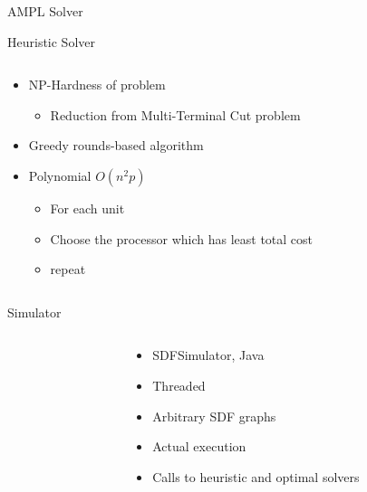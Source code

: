 \documentclass{beamer}
\begin{document}
\begin{frame}{AMPL Solver}

\end{frame}

\begin{frame}{Heuristic Solver}
\begin{columns}
\begin{column}{5cm}
\begin{itemize}
	\item NP-Hardness of problem
		\begin{itemize}
			\item Reduction from Multi-Terminal Cut problem
		\end{itemize}
	\item Greedy rounds-based algorithm
	\item Polynomial $O(n^2 p)$
		\begin{itemize}
			\item For each unit
			\item Choose the processor which has least total cost
			\item repeat
		\end{itemize}
\end{itemize}
\end{column}
\begin{column}{5cm}
\end{column}
\end{columns}
\end{frame}

\begin{frame}{Simulator}
\begin{columns}
\begin{column}{5cm}
\end{column}
\begin{column}{5cm}
\begin{itemize}
	\item SDFSimulator, Java
	\item Threaded
	\item Arbitrary SDF graphs
	\item Actual execution
	\item Calls to heuristic and optimal solvers
\end{itemize}
\end{column}
\end{columns}
\end{frame}
\end{document}
